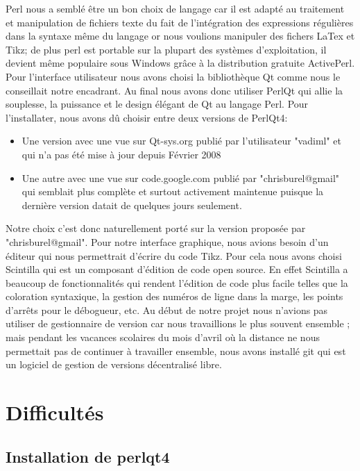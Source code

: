 \documentclass[a4paper]{report}
\begin{document}
Perl nous a semblé être un bon choix de langage car il est adapté au traitement et manipulation de fichiers texte du fait de l'intégration des expressions régulières dans la syntaxe même du langage or nous voulions manipuler des fichers LaTex et Tikz; de plus perl est portable sur la plupart des systèmes d'exploitation, il devient même populaire sous Windows grâce à la distribution gratuite ActivePerl. 
Pour l'interface utilisateur nous avons choisi la bibliothèque Qt comme nous le conseillait notre encadrant. Au final nous avons donc utiliser PerlQt qui allie la souplesse, la puissance et le design élégant de Qt au langage Perl. Pour l'installater, nous avons dû choisir entre deux versions de PerlQt4:
\begin{itemize}
 \item Une version avec une vue sur Qt-sys.org publié par l'utilisateur "vadiml" et qui n'a pas été mise à jour depuis Février 2008
 \item Une autre avec une vue sur code.google.com publié par "chrisburel@gmail" qui semblait plus complète et surtout activement maintenue puisque la dernière version datait de quelques jours seulement.
\end{itemize}
  Notre choix c'est donc naturellement porté sur la version proposée par "chrisburel@gmail".
  \newline 
  Pour notre interface graphique, nous avions besoin d'un éditeur qui nous permettrait d'écrire du code Tikz. Pour cela nous avons choisi Scintilla qui est un composant d'édition de code open source. En effet Scintilla a beaucoup de fonctionnalités qui rendent l'édition de code plus facile telles que la coloration syntaxique, la gestion des numéros de ligne dans la marge, les points d'arrêts pour le débogueur, etc.
  \newline
  Au début de notre projet nous n'avions pas utiliser de gestionnaire de version car nous travaillions le plus souvent ensemble ; mais pendant les vacances scolaires du mois d'avril où la distance ne nous permettait pas de continuer à travailler ensemble, nous avons installé git qui est un logiciel de gestion de versions décentralisé libre. 
\section{Difficultés} 
\subsection{Installation de perlqt4}
\end{document}
